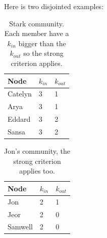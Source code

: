 \documentclass[10pt,a4paper]{article}
\begin{document}
\begin{enumerate}
Here is two disjointed examples: 

\begin{table}[H]
	\centering
	\caption{Stark community. Each member have a $k_{in}$ bigger than the $k_{out}$ so the strong criterion applies. }
	\label{my-asdf}
	\begin{tabular}{|l|l|l|}
		\hline
		\textbf{Node}    & $k_{in}$ & $k_{out}$ \\ \hline
		Catelyn & 3        & 1         \\ \hline
		Arya    & 3        & 1         \\ \hline
		Eddard  & 3        & 2         \\ \hline
		Sansa   & 3        & 2         \\ \hline
	\end{tabular}
\end{table}

\begin{table}[H]
	\centering
	\caption{Jon's community, the strong criterion applies too. }
	\label{my-label}
	\begin{tabular}{|l|l|l|}
		\hline
		Node    & $k_{in}$ & $k_{out}$ \\ \hline
		Jon     & 2        & 1         \\ \hline
		Jeor    & 2        & 0         \\ \hline
		Samwell & 2        & 0         \\ \hline
	\end{tabular}
\end{table}

\end{enumerate}
\end{document}
